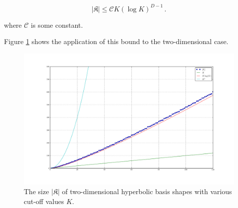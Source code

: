 \begin{equation}
  |\mathfrak{K}| \leq \mathcal{C} K \left(\log K\right)^{D-1} \,.
\end{equation}

where $\mathcal{C}$ is some constant.

Figure \ref{fig:hyperbolic_cut_basis_size} shows the application of this bound
to the two-dimensional case.

\begin{figure}
  \centering
  \includegraphics[width=0.8\linewidth]{./fig/basis_size.pdf}
  \caption{The size $|\mathfrak{K}|$ of two-dimensional hyperbolic basis shapes
           with various cut-off values $K$.}
  \label{fig:hyperbolic_cut_basis_size}
\end{figure}

